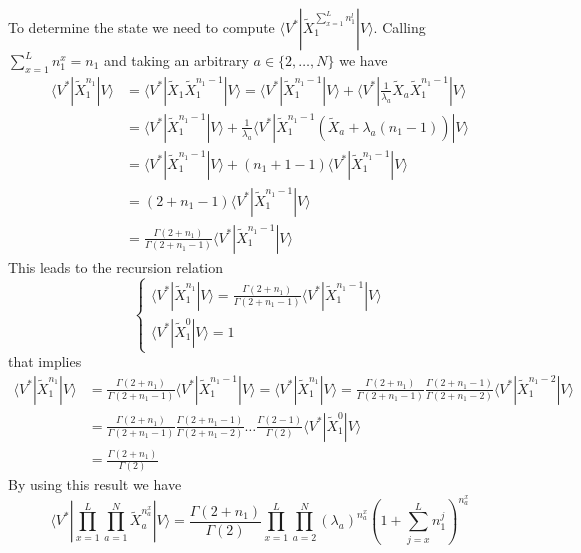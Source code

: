 \documentclass[10pt]{article}
\numberwithin{equation}{section}
\numberwithin{equation}{subsection}
\begin{document}
To determine the state we need to compute $\langle V^{*}|\widetilde{X}_{1}^{\sum_{x=1}^{L}n_{1}^{l}}|V\rangle$. Calling $\sum_{x=1}^{L}n_{1}^{x}=n_{1}$ and taking an arbitrary $a\in \{2,\ldots,N\}$ we have
\begin{align*}
	\langle V^{*}|\widetilde{X}_{1}^{n_{1}}|V\rangle&=\langle V^{*}|\widetilde{X}_{1}\widetilde{X}_{1}^{n_{1}-1}|V\rangle=\langle V^{*}|\widetilde{X}_{1}^{n_{1}-1}|V\rangle +\langle V^{*}|\frac{1}{\lambda_{a}}\widetilde{X}_{a}\widetilde{X}_{1}^{n_{1}-1}|V\rangle
	\\&=
	\langle V^{*}|\widetilde{X}_{1}^{n_{1}-1}|V\rangle+\frac{1}{\lambda_{a}}\langle V^{*}|\widetilde{X}_{1}^{n_{1}-1}\left(\widetilde{X}_{a}+\lambda_{a}(n_{1}-1)\right)|V\rangle
	\\&=
	\langle V^{*}|\widetilde{X}_{1}^{n_{1}-1}|V\rangle+\left(n_{1}+1-1\right)\langle V^{*}|\widetilde{X}_{1}^{n_{1}-1}|V\rangle
	\\&=
	\left(2+n_{1}-1\right)\langle V^{*}|\widetilde{X}_{1}^{n_{1}-1}|V\rangle
	\\&=
	\frac{\Gamma(2+n_{1})}{\Gamma(2+n_{1}-1)}\langle V^{*}|\widetilde{X}_{1}^{n_{1}-1}|V\rangle
\end{align*}
This leads to the recursion relation
\begin{equation}
	\begin{cases}
		\langle V^{*}|\widetilde{X}_{1}^{n_{1}}|V\rangle=\frac{\Gamma(2+n_{1})}{\Gamma(2+n_{1}-1)}\langle V^{*}|\widetilde{X}_{1}^{n_{1}-1}|V\rangle\\
		\langle V^{*}|\widetilde{X}_{1}^{0}|V\rangle=1
	\end{cases}
\end{equation}
that implies 
\begin{align*}
	\langle V^{*}|\widetilde{X}_{1}^{n_{1}}|V\rangle&=\frac{\Gamma(2+n_{1})}{\Gamma(2+n_{1}-1)}\langle V^{*}|\widetilde{X}_{1}^{n_{1}-1}|V\rangle=\langle V^{*}|\widetilde{X}_{1}^{n_{1}}|V\rangle=\frac{\Gamma(2+n_{1})}{\Gamma(2+n_{1}-1)}\frac{\Gamma(2+n_{1}-1)}{\Gamma(2+n_{1}-2)}\langle V^{*}|\widetilde{X}_{1}^{n_{1}-2}|V\rangle\\&=
	\frac{\Gamma(2+n_{1})}{\Gamma(2+n_{1}-1)}\frac{\Gamma(2+n_{1}-1)}{\Gamma(2+n_{1}-2)}\ldots \frac{\Gamma(2-1)}{\Gamma(2)}\langle V^{*}|\widetilde{X}_{1}^{0}|V\rangle
	\\&=
	\frac{\Gamma(2+n_{1})}{\Gamma(2)}
\end{align*}
By using this result we have 
\begin{equation}
	\langle V^{*}|\prod_{x=1}^{L}\prod_{a=1}^{N}\widetilde{X}_{a}^{n_{a}^{x}}
	|V \rangle=\frac{\Gamma(2+n_{1})}{\Gamma(2)}\prod_{x=1}^{L}\prod_{a=2}^{N}\left(\lambda_{a}\right)^{n_{a}^{x}}\left(1+\sum_{j=x}^{L}n_{1}^{j}\right)^{n_{a}^{x}}
\end{equation}
\end{document}
